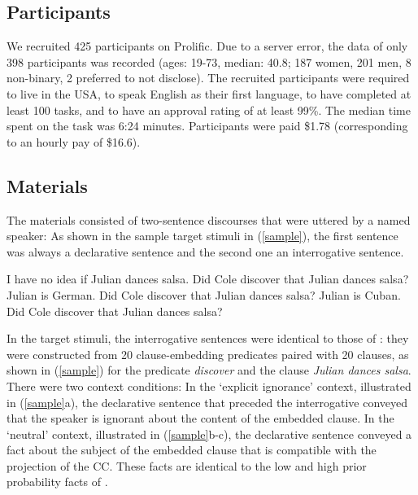 \documentclass[11pt,fleqn]{article}
\newcommand{\6}{\mbox{$[\hspace*{-.6mm}[$}}
\newcommand{\9}{\mbox{$]\hspace*{-.6mm}]$}}
\begin{document}
\subsection{Participants}

We recruited 425 participants on Prolific. Due to a server error, the data of only 398 participants was recorded (ages: 19-73, median: 40.8; 187 women, 201 men, 8 non-binary, 2 preferred to not disclose). The recruited participants were required to live in the USA, to speak English as their first language, to have completed at least 100 tasks, and to have an approval rating of at least 99\%. The median time spent on the task was 6:24 minutes. Participants were paid \$1.78 (corresponding to an hourly pay of \$16.6).


\subsection{Materials}

The materials consisted of two-sentence discourses that were uttered by a named speaker: As shown in the sample target stimuli in (\ref{sample}), the first sentence was always a declarative sentence and the second one an interrogative sentence. 

\begin{exe}
\ex\label{sample}
\begin{xlist}
\ex I have no idea if Julian dances salsa. Did Cole discover that Julian dances salsa?
\ex Julian is German. Did Cole discover that Julian dances salsa?
\ex Julian is Cuban. Did Cole discover that Julian dances salsa?
\end{xlist}
\end{exe}

In the target stimuli, the interrogative sentences were identical to those of \citealt{degen-tonhauser-openmind,degen-tonhauser-language}: they were constructed from 20 clause-embedding predicates paired with 20 clauses, as shown in (\ref{sample}) for the predicate {\em discover} and the clause {\em Julian dances salsa}. There were two context conditions: In the `explicit ignorance' context, illustrated in (\ref{sample}a), the declarative sentence that preceded the interrogative conveyed that the speaker is ignorant about the content of the embedded clause. In the `neutral' context, illustrated in (\ref{sample}b-c), the declarative sentence conveyed a fact about the subject of the embedded clause that is compatible with the projection of the CC. These facts are identical to the low and high prior probability facts of \citealt{degen-tonhauser-openmind}.  
\end{document}
